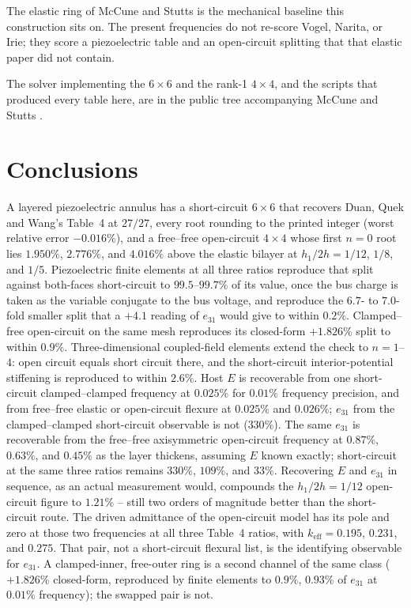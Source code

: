 \documentclass[11pt]{article}
\begin{document}
The elastic ring of McCune and Stutts \cite{mccune2026ring} is the
mechanical baseline this construction sits on. The present frequencies
do not re-score Vogel, Narita, or Irie; they score a piezoelectric table
and an open-circuit splitting that that elastic paper did not contain.

The solver implementing the $6\times6$ and the rank-1 $4\times4$, and
the scripts that produced every table here, are in the public tree
accompanying McCune and Stutts \cite{mccune2026ring}.

\section{Conclusions}\label{sec:conc}
A layered piezoelectric annulus has a short-circuit $6\times6$ that
recovers Duan, Quek and Wang's Table~4 at $27/27$, every root rounding
to the printed integer (worst relative error $-0.016\%$), and a
free--free open-circuit $4\times4$ whose first $n=0$
root lies $1.950\%$, $2.776\%$, and $4.016\%$ above the elastic bilayer
at $h_1/2h=1/12$, $1/8$, and $1/5$. Piezoelectric finite elements at all
three ratios reproduce that split against both-faces short-circuit to
$99.5$--$99.7\%$ of its value, once the bus charge is taken as the
variable conjugate to the bus voltage, and reproduce the $6.7$- to
$7.0$-fold smaller split that a $+4.1$ reading of $e_{31}$ would give to
within $0.2\%$. Clamped--free open-circuit on the
same mesh reproduces its closed-form $+1.826\%$ split to within
$0.9\%$. Three-dimensional coupled-field elements extend the check
to $n=1$--$4$: open circuit equals short circuit there, and the
short-circuit interior-potential stiffening is reproduced to within
$2.6\%$. Host $E$ is recoverable from one short-circuit
clamped--clamped frequency at $0.025\%$ for $0.01\%$ frequency
precision, and from free--free elastic or open-circuit flexure at
$0.025\%$ and $0.026\%$; $e_{31}$ from the clamped--clamped short-circuit
observable is not ($330\%$). The same
$e_{31}$ is recoverable from the free--free axisymmetric open-circuit
frequency at $0.87\%$, $0.63\%$, and $0.45\%$ as the layer thickens,
assuming $E$ known exactly; short-circuit at the same three ratios
remains $330\%$, $109\%$, and $33\%$. Recovering $E$ and $e_{31}$ in
sequence, as an actual measurement would, compounds the $h_1/2h=1/12$
open-circuit figure to $1.21\%$ -- still two orders of magnitude better
than the short-circuit route. The driven admittance
of the open-circuit model has its pole and zero at those two
frequencies at all three Table~4 ratios, with $k_{\mathrm{eff}}=0.195$,
$0.231$, and $0.275$. That
pair, not a short-circuit flexural list, is the identifying observable
for $e_{31}$. A clamped-inner, free-outer ring is a second channel of
the same class ($+1.826\%$ closed-form, reproduced by finite elements
to $0.9\%$, $0.93\%$ of $e_{31}$ at $0.01\%$ frequency); the swapped
pair is not.
\end{document}
